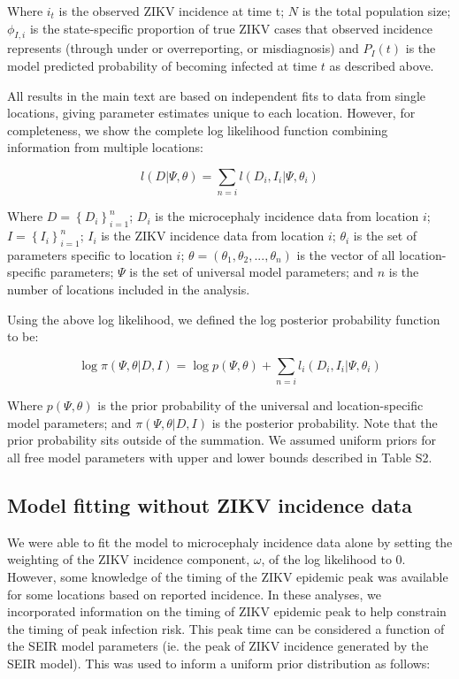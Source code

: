 \documentclass[10pt,letterpaper]{article}
\begin{document}
Where \(i_t\) is the observed ZIKV incidence at time t; \(N\) is the
total population size; \(\phi_{I,i}\) is the state-specific proportion
of true ZIKV cases that observed incidence represents (through under or
overreporting, or misdiagnosis) and \(P_I(t)\) is the model predicted
probability of becoming infected at time \(t\) as described above.

All results in the main text are based on independent fits to data from
single locations, giving parameter estimates unique to each location.
However, for completeness, we show the complete log likelihood function
combining information from multiple locations:

\begin{equation}
l(D|\Psi, \theta) = \sum_{n=i}l(D_i,I_i|\Psi, \theta_i)
\end{equation}

Where \(D=\left \{D_i\right \}^n_{i=1}\); \(D_i\) is the microcephaly
incidence data from location \(i\); \(I=\left \{I_i\right \}^n_{i=1}\);
\(I_i\) is the ZIKV incidence data from location \(i\); \(\theta_i\) is
the set of parameters specific to location \(i\);
\(\theta = (\theta_1, \theta_2, ..., \theta_n)\) is the vector of all
location-specific parameters; \(\Psi\) is the set of universal model
parameters; and \(n\) is the number of locations included in the
analysis.

Using the above log likelihood, we defined the log posterior probability
function to be:

\begin{equation}
\log \pi(\Psi, \theta|D,I) = \log p(\Psi, \theta) + \sum_{n=i}l_i(D_i, I_i|\Psi, \theta_i) 
\end{equation}

Where \(p(\Psi, \theta)\) is the prior probability of the universal and
location-specific model parameters; and \(\pi(\Psi, \theta|D,I)\) is the
posterior probability. Note that the prior probability sits outside of
the summation. We assumed uniform priors for all free model parameters
with upper and lower bounds described in Table S2.

\subsection{Model fitting without ZIKV incidence
data}\label{model-fitting-without-zikv-incidence-data}

We were able to fit the model to microcephaly incidence data alone by
setting the weighting of the ZIKV incidence component, \(\omega\), of
the log likelihood to 0. However, some knowledge of the timing of the
ZIKV epidemic peak was available for some locations based on reported
incidence. In these analyses, we incorporated information on the timing
of ZIKV epidemic peak to help constrain the timing of peak infection
risk. This peak time can be considered a function of the SEIR model
parameters (ie. the peak of ZIKV incidence generated by the SEIR model).
This was used to inform a uniform prior distribution as follows:
\end{document}
